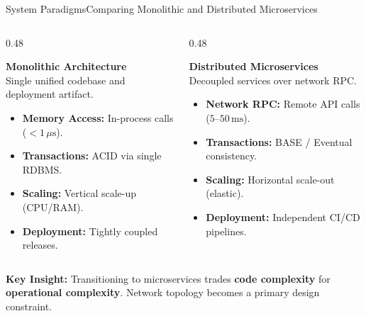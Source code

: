 \documentclass[aspectratio=169, 10pt]{beamer}
\begin{document}
\begin{frame}{System Paradigms}{Comparing Monolithic and Distributed Microservices}
  \vspace*{-0.35cm}
  \begin{columns}[T]
    \begin{column}{0.48\textwidth}
      \begin{tcolorbox}[nordicaccent]
        {\color{NordicDark}\bfseries Monolithic Architecture}\\[0.05cm]
        {\color{NordicGray}\scriptsize Single unified codebase and deployment artifact.}
        \vspace*{0.05cm}
        \begin{itemize}
          \item \textbf{Memory Access:} In-process calls ($<1\,\mu\text{s}$).
          \item \textbf{Transactions:} ACID via single RDBMS.
          \item \textbf{Scaling:} Vertical scale-up (CPU/RAM).
          \item \textbf{Deployment:} Tightly coupled releases.
        \end{itemize}
      \end{tcolorbox}
    \end{column}

    \begin{column}{0.48\textwidth}
      \begin{tcolorbox}[nordictealbox]
        {\color{NordicDark}\bfseries Distributed Microservices}\\[0.05cm]
        {\color{NordicGray}\scriptsize Decoupled services over network RPC.}
        \vspace*{0.05cm}
        \begin{itemize}
          \item \textbf{Network RPC:} Remote API calls ($5\text{--}50\,\text{ms}$).
          \item \textbf{Transactions:} BASE / Eventual consistency.
          \item \textbf{Scaling:} Horizontal scale-out (elastic).
          \item \textbf{Deployment:} Independent CI/CD pipelines.
        \end{itemize}
      \end{tcolorbox}
    \end{column}
  \end{columns}

  \vspace*{0.05cm}
  \begin{tcolorbox}[nordiccard]
    {\color{NordicDark}\bfseries Key Insight:} Transitioning to microservices trades \textbf{code complexity} for \textbf{operational complexity}. Network topology becomes a primary design constraint.
  \end{tcolorbox}
\end{frame}
\end{document}
